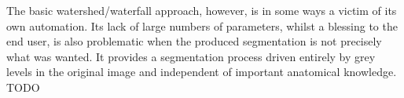 The basic watershed/waterfall approach, however, is in some ways a victim of its own automation. Its lack of large numbers of parameters, whilst a blessing to the end user, is also problematic when the produced segmentation is not precisely what was wanted. It provides a segmentation process driven entirely by grey levels in the original image and independent of important anatomical knowledge. TODO